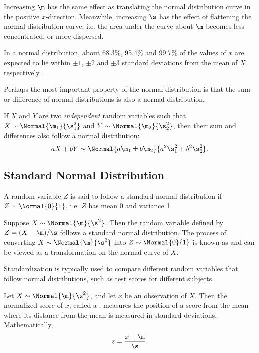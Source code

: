 \medskip

Increasing $\m$ has the same effect as translating the normal distribution curve in the positive $x$-direction. Meanwhile, increasing $\s$ has the effect of flattening the normal distribution curve, i.e. the area under the curve about $\m$ becomes less concentrated, or more dispersed.

In a normal distribution, about 68.3\%, 95.4\% and 99.7\% of the values of $x$ are expected to lie within $\pm 1$, $\pm 2$ and $\pm 3$ standard deviations from the mean of $X$ respectively.

Perhaps the most important property of the normal distribution is that the sum or difference of normal distributions is also a normal distribution.

\begin{proposition}
    If $X$ and $Y$ are two \emph{independent} random variables such that $X \sim \Normal{\m_1}{\s_1^2}$ and $Y \sim \Normal{\m_2}{\s_2^2}$, then their sum and differences also follow a normal distribution: \[aX + bY \sim \Normal{a \m_1 \pm b \m_2}{a^2 \s_1^2 + b^2 \s_2^2}.\]
\end{proposition}

\subsection{Standard Normal Distribution}

\begin{definition}
    A random variable $Z$ is said to follow a standard normal distribution if $Z \sim \Normal{0}{1}$, i.e. $Z$ has mean 0 and variance 1.
\end{definition}

Suppose $X \sim \Normal{\m}{\s^2}$. Then the random variable defined by $Z = (X - \m)/\s$ follows a standard normal distribution. The process of converting $X \sim \Normal{\m}{\s^2}$ into $Z \sim \Normal{0}{1}$ is known as  and can be viewed as a transformation on the normal curve of $X$.

Standardization is typically used to compare different random variables that follow normal distributions, such as test scores for different subjects.

\begin{definition}
    Let $X \sim \Normal{\m}{\s^2}$, and let $x$ be an observation of $X$. Then the normalized score of $x$, called a , measures the position of a score from the mean where its distance from the mean is measured in standard deviations. Mathematically, \[z = \frac{x - \m}{\s}.\]
\end{definition}


